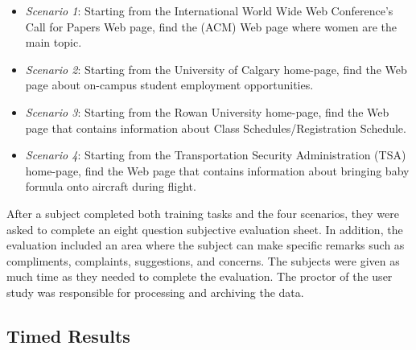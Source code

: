 \documentclass[]{article}
\begin{document}
{\begin{itemize}

\item {\em Scenario 1}: Starting from the International World Wide Web Conference's Call for Papers Web page, find the (ACM) Web page where women are the main topic.

\item {\em Scenario 2}: Starting from the University of Calgary home-page, find the Web page about on-campus student employment opportunities.

\item {\em Scenario 3}: Starting from the Rowan University home-page, find the Web page that contains information about Class Schedules/Registration Schedule.

\item {\em Scenario 4}: Starting from the Transportation Security Administration (TSA) home-page, find the Web page that contains information about bringing baby formula onto aircraft during flight.

\end{itemize}


After a subject completed both training tasks and the four scenarios, they were asked to complete an eight question subjective evaluation sheet.
In addition, the evaluation included an area where the subject can make specific remarks such as compliments, complaints, suggestions, and concerns.
The subjects were given as much time as they needed to complete the evaluation.
The proctor of the user study was responsible for processing and archiving the data.

\subsection{Timed Results}
\label{user_study_results}

\begin{table}[t]
\begin{center}
\begin{tabular}{|c|c|c|c|c|c|c|} \hline


\end{tabular}
\end{center}
\end{table}}
\end{document}
